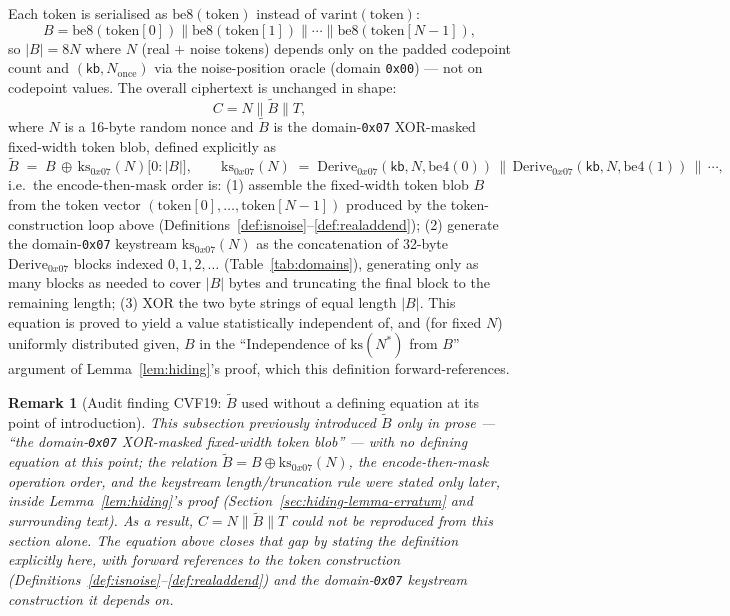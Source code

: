 \documentclass[11pt,a4paper]{article}
\newtheorem{remark}[theorem]{Remark}
\begin{document}
Each token is serialised as $\mathrm{be8}(\mathrm{token})$ instead of
$\mathrm{varint}(\mathrm{token})$:
\[
  B = \mathrm{be8}(\mathrm{token}[0]) \| \mathrm{be8}(\mathrm{token}[1]) \| \cdots \| \mathrm{be8}(\mathrm{token}[N-1]),
\]
so $\lvert B \rvert = 8N$ where $N$ (real $+$ noise tokens) depends only on
the padded codepoint count and $(\mathsf{kb}, N_{\text{once}})$ via the
noise-position oracle (domain \texttt{0x00}) --- not on codepoint values.
The overall ciphertext is unchanged in shape:
\[
  C = N \| \widetilde{B} \| T,
\]
where $N$ is a 16-byte random nonce and $\widetilde{B}$ is the
domain-\texttt{0x07} XOR-masked fixed-width token blob, defined explicitly
as
\[
  \widetilde{B} \;=\; B \,\oplus\, \mathrm{ks}_{0x07}(N)\bigl[0 : \lvert B \rvert\bigr],
  \qquad
  \mathrm{ks}_{0x07}(N) \;=\; \mathrm{Derive}_{0x07}(\mathsf{kb}, N, \mathrm{be4}(0)) \,\|\,
  \mathrm{Derive}_{0x07}(\mathsf{kb}, N, \mathrm{be4}(1)) \,\|\, \cdots,
\]
i.e.\ the encode-then-mask order is: (1) assemble the fixed-width token
blob $B$ from the token vector $(\mathrm{token}[0], \ldots,
\mathrm{token}[N-1])$ produced by the token-construction loop above
(Definitions~\ref{def:isnoise}--\ref{def:realaddend}); (2) generate the
domain-\texttt{0x07} keystream $\mathrm{ks}_{0x07}(N)$ as the
concatenation of 32-byte $\mathrm{Derive}_{0x07}$ blocks indexed
$0, 1, 2, \ldots$ (Table~\ref{tab:domains}), generating only as many
blocks as needed to cover $\lvert B \rvert$ bytes and truncating the final
block to the remaining length; (3) XOR the two byte strings of equal
length $\lvert B \rvert$. This equation is proved to yield a value
statistically independent of, and (for fixed $N$) uniformly distributed
given, $B$ in the ``Independence of $\mathrm{ks}(N^*)$ from $B$'' argument
of Lemma~\ref{lem:hiding}'s proof, which this definition forward-references.
\begin{remark}[Audit finding CVF19: $\widetilde{B}$ used without a defining equation at its point of introduction]
\label{rem:cvf19}
This subsection previously introduced $\widetilde{B}$ only in prose ---
``the domain-\texttt{0x07} XOR-masked fixed-width token blob'' --- with no
defining equation at this point; the relation
$\widetilde{B} = B \oplus \mathrm{ks}_{0x07}(N)$, the encode-then-mask
operation order, and the keystream length/truncation rule were stated
only later, inside Lemma~\ref{lem:hiding}'s proof
(Section~\ref{sec:hiding-lemma-erratum} and surrounding text). As a
result, $C = N \| \widetilde{B} \| T$ could not be reproduced from this
section alone. The equation above closes that gap by stating the
definition explicitly here, with forward references to the token
construction (Definitions~\ref{def:isnoise}--\ref{def:realaddend}) and the
domain-\texttt{0x07} keystream construction it depends on.
\end{remark}
\end{document}
